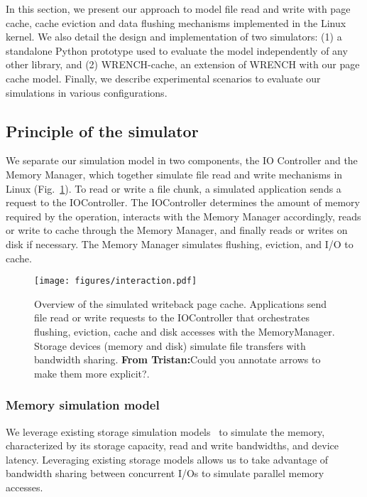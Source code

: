 \documentclass[conference]{IEEEtran}
\newcommand{\tristan}[1]{\color{orange}\textbf{From Tristan:}#1\color{black}}
\begin{document}
		In this section, we present our approach to model file read and write with 
		page cache, cache eviction and data flushing mechanisms implemented 
		in the Linux kernel. We also detail the design and implementation of two simulators:
		(1) a standalone Python prototype used to evaluate the model independently of any other 
		library, and (2) WRENCH-cache, an extension of WRENCH with our page cache model.
		Finally, we describe experimental scenarios to evaluate our simulations in various configurations.

		\subsection{Principle of the simulator}
	
			We separate our simulation model in two components, the IO
			Controller and the Memory Manager, which together simulate 
			file read and write mechanisms in Linux (Fig.~\ref{fig:interaction}). 
			To read or write a file chunk, a simulated application sends a request 
			to the IOController. The IOController determines the amount of memory required by the operation,
			interacts with the Memory Manager accordingly, reads or write to cache through the Memory Manager, 
			and finally reads or writes on disk if necessary.
			The Memory Manager simulates flushing, eviction, and I/O to cache.

			\begin{figure}
   				\centering
   				\texttt{[image: figures/interaction.pdf]}
				   \caption{Overview of the simulated writeback page cache.
				   Applications send file read or write requests to the
				   IOController that orchestrates flushing, eviction, cache
				   and disk accesses with the MemoryManager. Storage
				   devices (memory and disk) simulate file transfers with
				   bandwidth sharing. \tristan{Could you annotate arrows to
				   make them more explicit?}.}
				   \label{fig:interaction}
			\end{figure}

			\subsubsection{Memory simulation model}
			
			We leverage existing storage simulation models~\cite{lebre2015} to simulate the memory,
			characterized by its storage capacity, read and write bandwidths,
			and device latency.
			Leveraging existing storage models allows us 
			to take advantage of bandwidth sharing between concurrent I/Os to 
			simulate parallel memory accesses.
\end{document}
